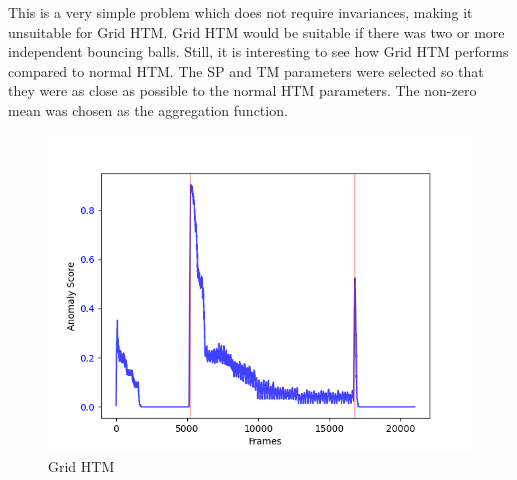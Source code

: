 \begin{table}[H]
    \centering
    \caption{TM Parameters}
    \label{tab:bb_TM_params}
\end{table}
This is a very simple problem which does not require invariances, making it unsuitable for Grid HTM. Grid HTM would be suitable if there was two or more independent bouncing balls. Still, it is interesting to see how Grid HTM performs compared to normal HTM. The SP and TM parameters were selected so that they were as close as possible to the normal HTM parameters. The non-zero mean was chosen as the aggregation function.
\begin{figure}[H]
    \centering
    \includegraphics[width=\textwidth]{resources/experiments/bouncing_ball/bb_grid.png}
    \caption{Grid HTM}
\end{figure}
